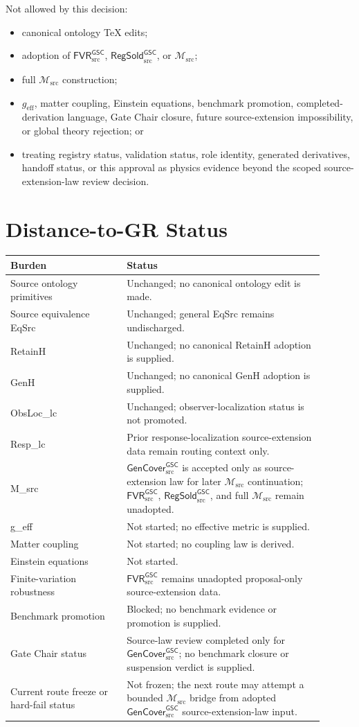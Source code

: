 \documentclass[11pt]{article}
\newcommand{\Msrc}{\mathcal{M}_{\mathrm{src}}}
\newcommand{\geff}{g_{\mathrm{eff}}}
\newcommand{\GenCover}{\mathsf{GenCover}_{\mathrm{src}}^{\mathsf{GSC}}}
\newcommand{\FVR}{\mathsf{FVR}_{\mathrm{src}}^{\mathsf{GSC}}}
\newcommand{\RegSold}{\mathsf{RegSold}_{\mathrm{src}}^{\mathsf{GSC}}}
\begin{document}
Not allowed by this decision:
\begin{itemize}
  \item canonical ontology TeX edits;
  \item adoption of \(\FVR\), \(\RegSold\), or \(\Msrc\);
  \item full \(\Msrc\) construction;
  \item \(\geff\), matter coupling, Einstein equations, benchmark promotion,
  completed-derivation language, Gate Chair closure, future source-extension
  impossibility, or global theory rejection; or
  \item treating registry status, validation status, role identity, generated
  derivatives, handoff status, or this approval as physics evidence beyond the
  scoped source-extension-law review decision.
\end{itemize}

\section{Distance-to-GR Status}

\begin{center}
\begin{tabular}{p{0.33\linewidth}p{0.57\linewidth}}
\hline
Burden & Status \\
\hline
Source ontology primitives & Unchanged; no canonical ontology edit is made. \\
Source equivalence EqSrc & Unchanged; general EqSrc remains undischarged. \\
RetainH & Unchanged; no canonical RetainH adoption is supplied. \\
GenH & Unchanged; no canonical GenH adoption is supplied. \\
ObsLoc\_lc & Unchanged; observer-localization status is not promoted. \\
Resp\_lc & Prior response-localization source-extension data remain routing context only. \\
M\_src & \(\GenCover\) is accepted only as source-extension law for later \(\Msrc\) continuation; \(\FVR\), \(\RegSold\), and full \(\Msrc\) remain unadopted. \\
g\_eff & Not started; no effective metric is supplied. \\
Matter coupling & Not started; no coupling law is derived. \\
Einstein equations & Not started. \\
Finite-variation robustness & \(\FVR\) remains unadopted proposal-only source-extension data. \\
Benchmark promotion & Blocked; no benchmark evidence or promotion is supplied. \\
Gate Chair status & Source-law review completed only for \(\GenCover\); no benchmark closure or suspension verdict is supplied. \\
Current route freeze or hard-fail status & Not frozen; the next route may attempt a bounded \(\Msrc\) bridge from adopted \(\GenCover\) source-extension-law input. \\
\hline
\end{tabular}
\end{center}
\end{document}
